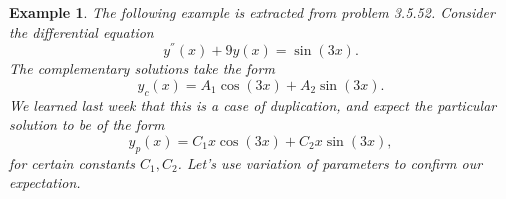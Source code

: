 \documentclass[11pt]{amsart}
\newtheorem{example}{Example}
\numberwithin{equation}{section}
\begin{document}
\begin{example}
The following example is extracted from problem 3.5.52. Consider the differential equation 
\begin{equation*}
y^{''}(x)+9y(x)=\sin(3x).
\end{equation*}
The complementary solutions take the form 
\begin{equation*}
y_c(x)=A_1\cos(3x)+A_2\sin(3x).
\end{equation*}
We learned last week that this is a case of duplication, and expect the particular solution to be of the form 
\begin{equation*}
y_p(x)=C_1x\cos(3x)+C_2x\sin(3x),
\end{equation*}
for certain constants $C_1,C_2$. Let's use variation of parameters to confirm our expectation. 


\end{example}
\end{document}
